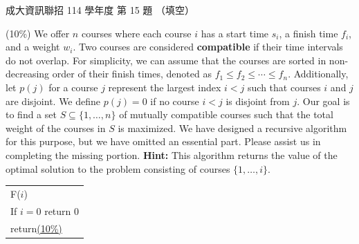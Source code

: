 \begin{pastexam}[label={px:ncku-114-prog-15}]{成大資訊聯招 114 學年度 第 15 題}
（填空）

(10\%) We offer $n$ courses where each course $i$ has a start time $s_i$, a finish time $f_i$, and a weight $w_i$. Two courses are considered \textbf{compatible} if their time intervals do not overlap. For simplicity, we can assume that the courses are sorted in non-decreasing order of their finish times, denoted as $f_1\le f_2\le\cdots\le f_n$. Additionally, let $p(j)$ for a course $j$ represent the largest index $i<j$ such that courses $i$ and $j$ are disjoint. We define $p(j)=0$ if no course $i<j$ is disjoint from $j$. Our goal is to find a set $S\subseteq\{1,\ldots,n\}$ of mutually compatible courses such that the total weight of the courses in $S$ is maximized. We have designed a recursive algorithm for this purpose, but we have omitted an essential part. Please assist us in completing the missing portion. \textbf{Hint:} This algorithm returns the value of the optimal solution to the problem consisting of courses $\{1,\ldots,i\}$.
\begin{center}
\begin{tabular}{|p{}|}
\hline
F($i$) \\
\quad If $i=0$ return 0 \\
\quad return\underline{\qquad (10\%)\qquad} \\
\hline
\end{tabular}
\end{center}
\end{pastexam}


